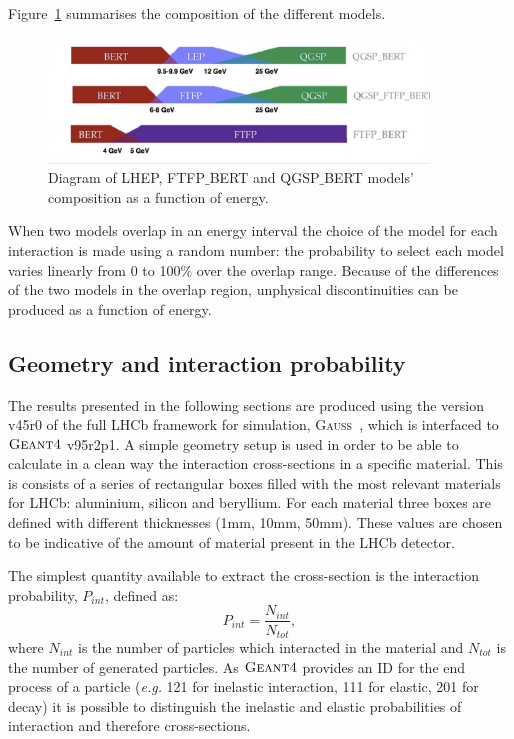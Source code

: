 Figure~\ref{fig:models} summarises the composition of the different models.
%
\begin{center}
\begin{figure}[b]
\centering \includegraphics[width=0.9\textwidth,trim={0 1mm 0 0},clip]{detector/figs/validation/models.png}
\caption{Diagram of LHEP, FTFP$\_$BERT and QGSP$\_$BERT models' composition as a function of energy.}
\label{fig:models}
\end{figure}
\end{center}
%
When two models overlap in an energy interval the choice of the model
for each interaction is made using a random number: the probability to select each model varies linearly
from 0 to 100\% over the overlap range. Because of the differences of the two models in the overlap region,
unphysical discontinuities can be produced as a function of energy.

\subsection{Geometry and interaction probability}
\label{GeomandPint}

The results presented in the following sections are produced using the version v45r0 of the full LHCb framework
for simulation, \textsc{Gauss}~\cite{LHCb-PROC-2011-006}, which is interfaced to $\textsc{Geant4}$ v95r2p1.
A simple geometry setup is used in order to be able to calculate in a clean way the interaction cross-sections
in a specific material. This is consists of a series of rectangular boxes filled with the most relevant materials
for LHCb: aluminium, silicon and beryllium. For each material three boxes are defined with different thicknesses
(1mm, 10mm, 50mm). These values are chosen to be indicative of the amount of material present in the LHCb detector.

The simplest quantity available to extract the cross-section is the interaction probability, $P_{int}$, defined as:
%
\begin{equation}
P_{int} = \frac{N_{int}}{N_{tot}},
\end{equation}
%
where $N_{int}$ is the number of particles which interacted in the material and $N_{tot}$ is the number of generated particles.
As $\textsc{Geant4}$ provides an ID for the end process of a particle (\emph{e.g.} 121 for inelastic interaction, 111 for elastic, 
201 for decay) it is possible to distinguish the inelastic and elastic probabilities of interaction and therefore cross-sections.

